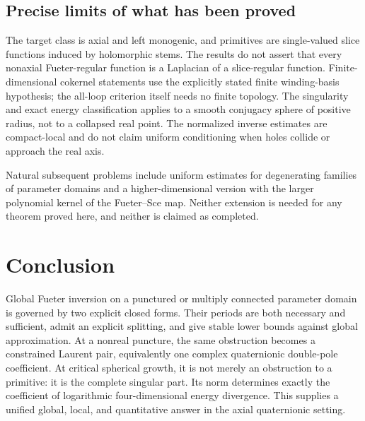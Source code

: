\documentclass[11pt,a4paper]{article}
\numberwithin{equation}{section}
\theoremstyle{definition}
\theoremstyle{remark}
\begin{document}
\subsection{Precise limits of what has been proved}
The target class is axial and left monogenic, and primitives are
single-valued slice functions induced by holomorphic stems. The results
do not assert that every nonaxial Fueter-regular function is a Laplacian
of a slice-regular function. Finite-dimensional cokernel statements use
the explicitly stated finite winding-basis hypothesis; the all-loop
criterion itself needs no finite topology. The singularity and exact
energy classification applies to a smooth conjugacy sphere of positive
radius, not to a collapsed real point. The normalized inverse estimates
are compact-local and do not claim uniform conditioning when holes
collide or approach the real axis.

Natural subsequent problems include uniform estimates for degenerating
families of parameter domains and a higher-dimensional version with the
larger polynomial kernel of the Fueter--Sce map. Neither extension is
needed for any theorem proved here, and neither is claimed as completed.

\section*{Conclusion}
Global Fueter inversion on a punctured or multiply connected parameter
domain is governed by two explicit closed forms. Their periods are both
necessary and sufficient, admit an explicit splitting, and give stable
lower bounds against global approximation. At a nonreal puncture, the
same obstruction becomes a constrained Laurent pair, equivalently one
complex quaternionic double-pole coefficient. At critical spherical
growth, it is not merely an obstruction to a primitive: it is the complete
singular part. Its norm determines exactly the coefficient of logarithmic
four-dimensional energy divergence. This supplies a unified global,
local, and quantitative answer in the axial quaternionic setting.
\end{document}
